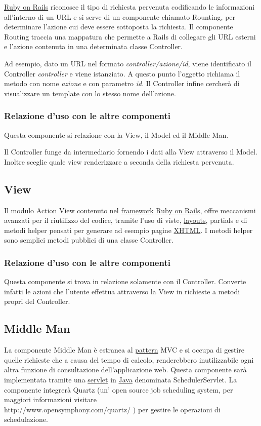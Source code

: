 \documentclass[11pt,a4paper]{article}
\begin{document}
\underline{Ruby on Rails} riconosce il tipo di richiesta pervenuta codificando le informazioni all'interno di un URL e si serve di un componente chiamato Rounting, per determinare l'azione cui deve essere sottoposta la richiesta.
Il componente Routing traccia una mappatura che permette a Rails di collegare gli URL esterni e l'azione contenuta in una determinata classe Controller.

Ad esempio, dato un URL nel formato \textit{controller/azione/id}, viene identificato il Controller \textit{controller} e viene istanziato. A questo punto l'oggetto richiama il metodo con nome \textit{azione} e con parametro \textit{id}. Il Controller infine cercherà di visualizzare un \underline{template} con lo stesso nome dell'azione. 
\subsubsection{Relazione d'uso con le altre componenti}
Questa componente si relazione con la View, il Model ed il Middle Man. 

Il Controller funge da intermediario fornendo i dati alla View attraverso il Model. Inoltre sceglie quale view renderizzare a seconda della richiesta pervenuta.

\subsection{View}\label{view}
 Il modulo Action View contenuto nel \underline{framework} \underline{Ruby on Rails}, offre meccanismi avanzati per il riutilizzo del codice, tramite l'uso di viste, \underline{layouts}, partials e di metodi helper pensati per generare ad esempio pagine \underline{XHTML}.
I metodi helper sono semplici metodi pubblici di una classe Controller.
\subsubsection{Relazione d'uso con le altre componenti}
Questa componente si trova in relazione solamente con il Controller. Converte infatti le azioni che l'utente effettua attraverso la View in richieste a metodi propri del Controller.
\subsection{Middle Man}
La componente Middle Man è estranea al \underline{pattern} MVC e si occupa di gestire quelle richieste che a causa del tempo di calcolo, renderebbero inutilizzabile ogni altra funzione di consultazione dell'applicazione web. 
Questa componente sarà implementata tramite una \underline{servlet} in \underline{Java} denominata SchedulerServlet.
La componente integrerà Quartz (un' open source job scheduling system, per maggiori informazioni visitare \\ http://www.opensymphony.com/quartz/ ) per gestire le operazioni di schedulazione.
\end{document}
